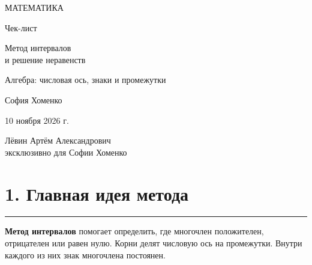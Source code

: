\documentclass[a4paper,11pt]{article}
\newcommand{\sectionhead}[1]{\section*{\color{darkaccent}#1}\vspace{-4pt}\noindent\color{accent}\rule{\linewidth}{0.5pt}\color{textgray}\vspace{3pt}}
\begin{document}
\color{textgray}
\thispagestyle{empty}
\begin{titlepage}
\centering
\vspace*{18mm}
{\large\color{darkaccent} МАТЕМАТИКА\par}
\vspace{21mm}
{\LARGE Чек-лист\par}
\vspace{11mm}
{\LARGE\color{accent} Метод интервалов\\[4pt] и решение неравенств\par}
\vspace{23mm}
{\large Алгебра: числовая ось, знаки и промежутки\par}
\vfill
{\large София Хоменко\par}
\vspace{13mm}
{\normalsize 10 ноября 2026 г.\par}
\vspace{24mm}
{\small Лёвин Артём Александрович\\[3pt]эксклюзивно для Софии Хоменко\par}
\vspace{15mm}
\end{titlepage}
\clearpage
\sectionhead{1. Главная идея метода}
\textbf{Метод интервалов} помогает определить, где многочлен положителен, отрицателен или равен нулю. Корни делят числовую ось на промежутки. Внутри каждого из них знак многочлена постоянен.
\end{document}
